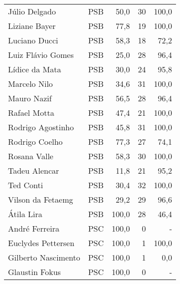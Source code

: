 \begin{longtable}{llrrr}
                       Júlio Delgado &            PSB &      50,0 &           30 &      100,0 \\
                       Liziane Bayer &            PSB &      77,8 &           19 &      100,0 \\
                       Luciano Ducci &            PSB &      58,3 &           18 &       72,2 \\
                   Luiz Flávio Gomes &            PSB &      25,0 &           28 &       96,4 \\
                      Lídice da Mata &            PSB &      30,0 &           24 &       95,8 \\
                        Marcelo Nilo &            PSB &      34,6 &           31 &      100,0 \\
                         Mauro Nazif &            PSB &      56,5 &           28 &       96,4 \\
                        Rafael Motta &            PSB &      47,4 &           21 &      100,0 \\
                   Rodrigo Agostinho &            PSB &      45,8 &           31 &      100,0 \\
                      Rodrigo Coelho &            PSB &      77,3 &           27 &       74,1 \\
                        Rosana Valle &            PSB &      58,3 &           30 &      100,0 \\
                       Tadeu Alencar &            PSB &      11,8 &           21 &       95,2 \\
                           Ted Conti &            PSB &      30,4 &           32 &      100,0 \\
                   Vilson da Fetaemg &            PSB &      29,2 &           29 &       96,6 \\
                          Átila Lira &            PSB &     100,0 &           28 &       46,4 \\
                      André Ferreira &            PSC &     100,0 &            0 &          - \\
                  Euclydes Pettersen &            PSC &     100,0 &            1 &      100,0 \\
                 Gilberto Nascimento &            PSC &     100,0 &            1 &        0,0 \\
                      Glaustin Fokus &            PSC &     100,0 &            0 &          - \\

\end{longtable}

